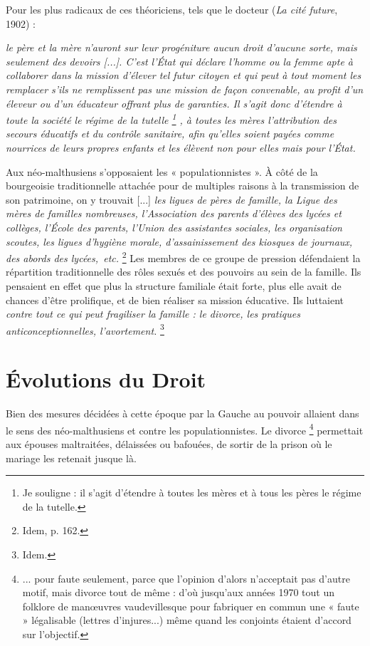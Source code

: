  Pour les plus radicaux de ces théoriciens, tels que le docteur  (\emph{La cité future}, 1902) : {\emph{le père et la mère n'auront sur leur progéniture aucun droit d'aucune sorte, mais seulement des devoirs \emph{[...]}. C'est l'État qui déclare l'homme ou la femme apte à collaborer dans la mission d'élever tel futur citoyen et qui peut à tout moment les remplacer s'ils ne remplissent pas une mission de façon convenable, au profit d'un éleveur ou d'un éducateur offrant plus de garanties. Il s'agit donc d'étendre à toute la société le régime de la tutelle%
\footnote{Je souligne : il s'agit d'étendre à toutes les mères et à tous les pères le régime de la tutelle.}%
, à toutes les mères l'attribution des secours éducatifs et du contrôle sanitaire, afin qu'elles soient payées comme nourrices de leurs propres enfants et les élèvent non pour elles mais pour l'État.}%


 Aux néo-malthusiens s'opposaient les « populationnistes ». À côté de la bourgeoisie traditionnelle attachée pour de multiples raisons à la transmission de son patrimoine, on y trouvait {[...] \emph{les ligues de pères de famille, la Ligue des mères de familles nombreuses, l'Association des parents d'élèves des lycées et collèges, l'École des parents, l'Union des assistantes sociales, les organisation scoutes, les ligues d'hygiène morale, d'assainissement des kiosques de journaux, des abords des lycées,~etc.}%
\footnote{Idem, p. 162.}%
} Les membres de ce groupe de pression défendaient la répartition traditionnelle des rôles sexués et des pouvoirs au sein de la famille. Ils pensaient en effet que plus la structure familiale était forte, plus elle avait de chances d'être prolifique, et de bien réaliser sa mission éducative. Ils luttaient {\emph{contre tout ce qui peut fragiliser la famille : le divorce, les pratiques anticonceptionnelles, l'avortement.}%
\footnote{Idem.} 
}


\section{Évolutions du Droit}

 Bien des mesures décidées à cette époque par la Gauche au pouvoir allaient dans le sens des néo-malthusiens et contre les populationnistes. Le divorce%
\footnote{... pour faute seulement, parce que l'opinion d'alors n'acceptait pas d'autre motif, mais divorce tout de même : d'où jusqu'aux années 1970 tout un folklore de manœuvres vaudevillesque pour fabriquer en commun une « faute » légalisable (lettres d'injures...) même quand les conjoints étaient d'accord sur l'objectif.} 
permettait aux épouses maltraitées, délaissées ou bafouées, de sortir de la prison où le mariage les retenait jusque là. 

}
